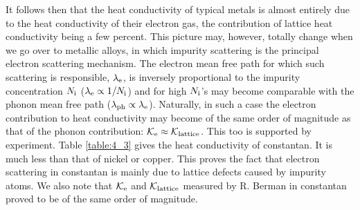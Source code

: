 It follows then that the heat conductivity of typical metals is almost entirely due to the heat conductivity of their electron gas, the contribution of lattice heat conductivity being a few percent. This picture may, however, totally change when we go over to metallic alloys, in which impurity scattering is the principal electron scattering mechanism. The electron mean free path for which such scattering is responsible, $\lambda_{\text{e}}$, is inversely proportional to the impurity concentration $N_{\text{i}}$ ($\lambda_{\text{e}}\propto 1/N_{\text{i}}$) and for high $N_{\text{i}}$'s may become comparable with the phonon mean free path ($\lambda_{\text{ph}}\propto\lambda_{\text{e}}$). Naturally, in such a case the electron contribution to heat conductivity may become of the same order of magnitude as that of the phonon contribution: $\mathcal{K}_{\text{e}}\approx\mathcal{K}_{\text{lattice}}$.
This too is supported by experiment. Table \ref{table:4_3} gives the heat conductivity of constantan. It is much less than that of nickel or copper. This proves the fact that electron scattering in constantan is mainly due to lattice defects caused by impurity atoms. We also note that $\mathcal{K}_{\text{e}}$ and $\mathcal{K}_{\text{lattice}}$ measured by R. Berman in constantan proved to be of the same order of magnitude.

